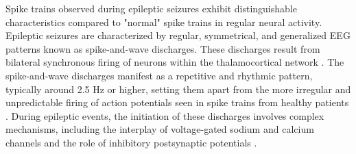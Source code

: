 \documentclass[a4paper, UKenglish, 11pt]{uiomaster}
\begin{document}
Spike trains observed during epileptic seizures exhibit distinguishable characteristics compared to "normal" spike trains in regular neural activity. Epileptic seizures are characterized by regular, symmetrical, and generalized EEG patterns known as spike-and-wave discharges. These discharges result from bilateral synchronous firing of neurons within the thalamocortical network \cite{wiki:electroencephalography}. The spike-and-wave discharges manifest as a repetitive and rhythmic pattern, typically around 2.5 Hz or higher, setting them apart from the more irregular and unpredictable firing of action potentials seen in spike trains from healthy patients \cite{gerstner2014neuronal}. During epileptic events, the initiation of these discharges involves complex mechanisms, including the interplay of voltage-gated sodium and calcium channels and the role of inhibitory postsynaptic potentials \cite{wiki:electroencephalography}.


\end{document}
